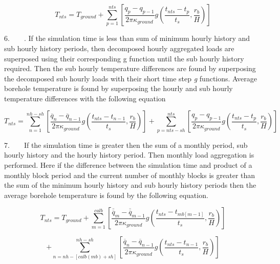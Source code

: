 \begin{equation}
{T_{nts}} = {T_{ground}} + \sum\limits_{p = 1}^{nts} {\left[ {\frac{{{q_p} - {q_{p - 1}}}}{{2\pi {\kappa_{ground}}}}g\left( {\frac{{{t_{nts}} - {t_p}}}{{{t_s}}},\frac{{{r_b}}}{H}} \right)} \right]}
\end{equation}

6.~~~~. If the simulation time is less than sum of minimum hourly history and sub hourly history periods, then decomposed hourly aggregated loads are superposed using their corresponding g function until the sub hourly history required. Then the sub hourly temperature differences are found by superposing the decomposed sub hourly loads with their short time step \emph{g} functions. Average borehole temperature is found by superposing the hourly and sub hourly temperature differences with the following equation

\begin{equation}
{T_{nts}} = \sum\limits_{n = 1}^{nh - sh} {\left[ {\frac{{{{\overline q }_n} - {{\overline q }_{n - 1}}}}{{2\pi {\kappa_{ground}}}}g\left( {\frac{{{t_{nts}} - {t_{n - 1}}}}{{{t_s}}},\frac{{{r_b}}}{H}} \right)} \right]}  + \sum\limits_{p = nts - sh}^{nts} {\left[ {\frac{{{q_p} - {q_{p - 1}}}}{{2\pi {\kappa_{ground}}}}g\left( {\frac{{{t_{nts}} - {t_p}}}{{{t_s}}},\frac{{{r_b}}}{H}} \right)} \right]}
\end{equation}

7.~~~~If the simulation time is greater then the sum of a monthly period, sub hourly history and the hourly history period. Then monthly load aggregation is performed. Here if the difference between the simulation time and product of a monthly block period and the current number of monthly blocks is greater than the sum of the minimum hourly history and sub hourly history periods then the average borehole temperature is found by the following equation.

\begin{equation}
{T_{nts}} = {T_{ground}} + \sum\limits_{m = 1}^{calb} {\left[ {\frac{{{{\overline{\overline q} }_m} - {{\overline{\overline q} }_{m - 1}}}}{{2\pi {\kappa_{ground}}}}g\left( {\frac{{{t_{nts}} - {t_{mb[m - 1]}}}}{{{t_s}}},\frac{{{r_b}}}{H}} \right)} \right]}
\end{equation}

\begin{equation}
+ \sum\limits_{n = nh - [calb(mb) + sh]}^{nh - sh} {\left[ {\frac{{{{\overline q }_n} - {{\overline q }_{n - 1}}}}{{2\pi {\kappa_{ground}}}}g\left( {\frac{{{t_{nts}} - {t_{n - 1}}}}{{{t_s}}},\frac{{{r_b}}}{H}} \right)} \right]}
\end{equation}

